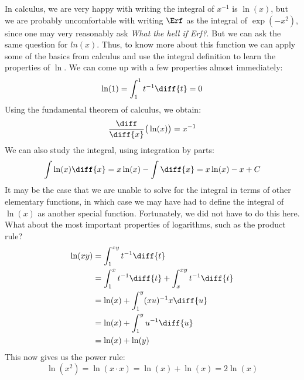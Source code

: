         In calculus, we are very happy with writing the integral
        of $x^{-1}$ is $\ln(x)$, but we are probably uncomfortable
        with writing $\Erf$ as the integral of $\exp(-x^{2})$,
        since one may very reasonably ask
        \textit{What the hell if Erf?}. But we can ask the same
        question for $ln(x)$. Thus, to know more about this function
        we can apply some of the basics from calculus and use the
        integral definition to learn the properties of $\ln$.
        We can come up with a few properties almost immediately:
        \begin{equation}
            \ln(1)=\int_{1}^{1}t^{-1}\diff{t}=0
        \end{equation}
        Using the fundamental theorem of calculus, we obtain:
        \begin{equation}
            \frac{\diff}{\diff{x}}\big(\ln(x)\big)
            =x^{-1}
        \end{equation}
        We can also study the integral, using integration by parts:
        \begin{equation}
            \int\ln(x)\diff{x}
            =x\ln(x)-\int\diff{x}
            =x\ln(x)-x+C
        \end{equation}
        It may be the case that we are unable to solve for the
        integral in terms of other elementary functions, in which
        case we may have had to define the integral of $\ln(x)$
        as another special function. Fortunately, we did not have
        to do this here. What about the most important properties
        of logarithms, such as the product rule?
        \begin{subequations}
            \begin{align}
                \ln(xy)&=\int_{1}^{xy}t^{-1}\diff{t}\\
                &=\int_{1}^{x}t^{-1}\diff{t}
                +\int_{x}^{xy}t^{-1}\diff{t}\\
                &=\ln(x)+\int_{1}^{y}(xu)^{-1}x\diff{u}\\
                &=\ln(x)+\int_{1}^{y}u^{-1}\diff{u}\\
                &=\ln(x)+\ln(y)
            \end{align}
        \end{subequations}
        This now gives us the power rule:
        \begin{equation}
            \ln(x^{2})=\ln(x\cdot{x})=\ln(x)+\ln(x)=2\ln(x)
        \end{equation}
